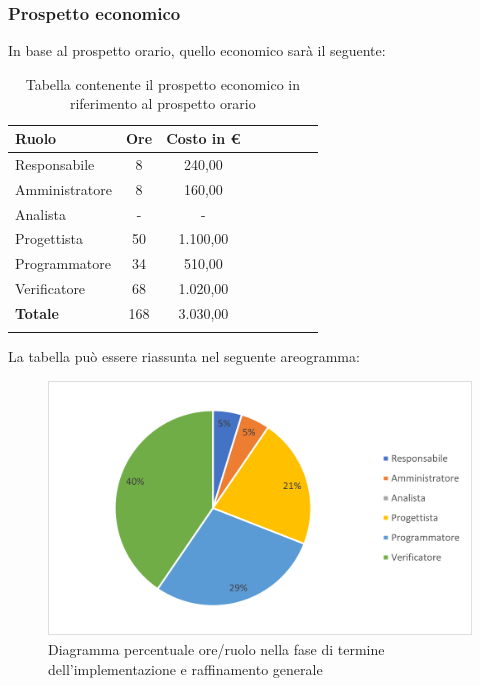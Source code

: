 			\subsubsection{Prospetto economico}
			In base al prospetto orario, quello economico sarà il seguente: 
			
			\begin{longtable}{|l|c|c|c|c|c|c|c|}
				\hline
				\rowcolor{lighter-grayer}
				\textbf{Ruolo} & \textbf{Ore} & \textbf{Costo in €} \\
				\hline
				\endfirsthead
				
				\hline
				Responsabile & 8 & 240,00\\
				\hline
				\hline
				Amministratore & 8 & 160,00\\
				\hline
				\hline
				Analista & - & -\\
				\hline
				\hline
				Progettista & 50 & 1.100,00\\
				\hline
				\hline
				Programmatore & 34 & 510,00\\
				\hline
				\hline
				Verificatore & 68 & 1.020,00\\
				\hline
				\hline
				\textbf{Totale} & 168 & 3.030,00\\
				\hline
				\rowcolor{white}
				\caption{Tabella contenente il prospetto economico in riferimento al prospetto orario}
			\end{longtable}
			\pagebreak
		
			La tabella può essere riassunta nel seguente areogramma:
			\begin{figure}[H]
				\centering
				\includegraphics[width=0.8\linewidth]{res/images/preventivo/6-2.png}
				\caption{Diagramma percentuale ore/ruolo nella fase di termine dell'implementazione e raffinamento generale}
				\label{fig:diagramma costi ruolo fase termine dell'implementazione e raffinamento generale}
            \end{figure}


